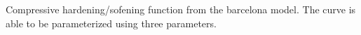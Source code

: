 \label{fig:barcelona} Compressive hardening/sofening function from the barcelona model. The curve is able to be parameterized using three parameters.